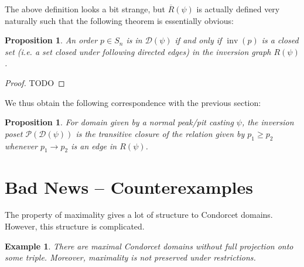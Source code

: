 \documentclass[12pt]{article}
\newtheorem{example}[theorem]{Example}
\newtheorem{proposition}[theorem]{Proposition}
\newcommand{\D}{\mathcal{D}}
\newcommand{\PP}{\mathcal{P}}
\DeclareMathOperator*{\inv}{inv}
\newcommand{\1}[1]{\mathds{1}[{#1}]}
\begin{document}
  The above definition looks a bit strange, but $\overline R(\psi)$ 
  is actually defined very naturally such that the following theorem is
  essentially obvious:

  \begin{proposition}
    An order $p \in S_n$ is in $\D(\psi)$ if and only if $\inv(p)$
    is a closed set (i.e. a set closed under following directed edges)
    in the inversion graph $R(\psi)$.
  \end{proposition}
  \begin{proof}
    TODO
  \end{proof}

  We thus obtain the following correspondence with the previous section:
  \begin{proposition}
    For domain given by a normal peak/pit casting $\psi$,
    the inversion poset $\PP(\D(\psi))$ is the transitive closure of the relation
    given by $p_1 \ge p_2$ whenever $p_1\longrightarrow p_2$ is an edge in 
    $R(\psi)$.
  \end{proposition}

\section{Bad News -- Counterexamples}

  The property of maximality gives a lot of structure to Condorcet domains.
  However, this structure is complicated.

  \begin{example}
    There are maximal Condorcet domains without full projection onto some
    triple. Moreover, maximality is not preserved under restrictions.
  \end{example}
\end{document}
